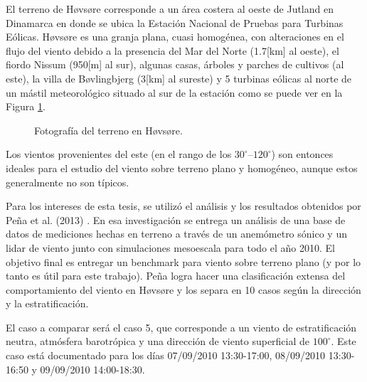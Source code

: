  El terreno de Høvsøre corresponde a un área costera al oeste de Jutland en Dinamarca en donde se ubica la Estación Nacional de Pruebas para Turbinas Eólicas. Høvsøre es una granja plana, cuasi homogénea, con alteraciones en el flujo del viento debido a la presencia del Mar del Norte (1.7[km] al oeste), el fiordo Nissum (950[m] al sur), algunas casas, árboles y parches de cultivos (al este), la villa de Bøvlingbjerg (3[km] al sureste) y 5 turbinas eólicas al norte de un mástil meteorológico situado al sur de la estación como se puede ver en la Figura \ref{fig:05_terreno_hovsore}.
 
 \begin{figure}[H]
 	\centering{}%
 	\caption{Fotografía del terreno en Høvsøre.}
 	\label{fig:05_terreno_hovsore}
 \end{figure}
 
 Los vientos provenientes del este (en el rango de los $30^\circ$--$120^\circ$) son entonces ideales para el estudio del viento sobre terreno plano y homogéneo, aunque estos generalmente no son típicos.
 
 Para los intereses de esta tesis, se utilizó el análisis y los resultados obtenidos por Peña et al. (2013) \cite{Pea2013}. En esa investigación se entrega un análisis de una base de datos de mediciones hechas en terreno a través de un anemómetro sónico y un lidar de viento junto con simulaciones mesoescala para todo el año 2010. El objetivo final es entregar un benchmark para viento sobre terreno plano (y por lo tanto es útil para este trabajo). Peña logra hacer una clasificación extensa del comportamiento del viento en Høvsøre y los separa en 10 casos según la dirección y la estratificación.
 
 El caso a comparar será el caso 5, que corresponde a un viento de estratificación neutra, atmósfera barotrópica y una dirección de viento superficial de $100^\circ$. Este caso está documentado para los días 07/09/2010 13:30-17:00, 08/09/2010 13:30-16:50 y 09/09/2010 14:00-18:30. 


